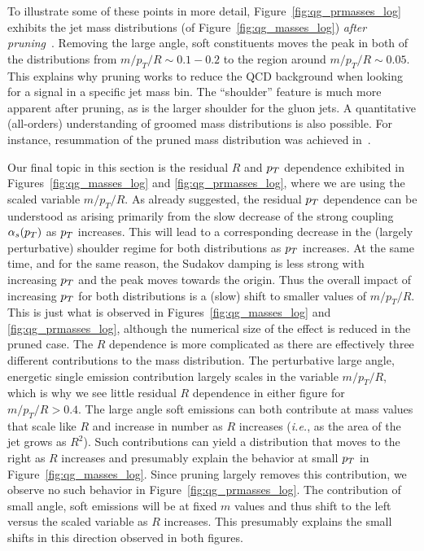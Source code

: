 To illustrate some of these points in more detail, Figure~\ref{fig:qg_prmasses_log} exhibits the jet mass distributions (of  Figure~\ref{fig:qg_masses_log}) 
\textit{after pruning}~\cite{Ellis:2009me,Ellis:2009su}.  Removing the large angle,  soft constituents
moves the peak in both of the distributions from  $m/p_T/R \sim 0.1 - 0.2$ to the region around $m/p_T/R \sim 0.05$.  This explains why pruning works to reduce the
QCD background when looking for a signal in a specific jet mass bin.  The ``shoulder'' feature is much more apparent after pruning, as is the larger shoulder for
the gluon jets.  A quantitative (all-orders) understanding of groomed mass distributions is also possible. For instance, resummation of the pruned mass distribution was achieved in~\cite{Dasgupta:2013ihk,Dasgupta:2013via}.

Our final topic in this section is the residual $R$ and $p_T$ dependence exhibited in Figures~\ref{fig:qg_masses_log} and \ref{fig:qg_prmasses_log}, where we are
using the scaled variable $m/p_T/R$.  As already suggested, the residual $p_T$ dependence can be understood as arising primarily from the slow decrease of the strong
coupling $\alpha_s(p_T)$ as $p_T$ increases.  This will lead to a corresponding decrease in the (largely perturbative) shoulder regime for both distributions
as $p_T$ increases.  At the same time, and for the same reason, the Sudakov damping is less strong with increasing $p_T$ and the peak moves towards the origin.
Thus the overall impact of increasing $p_T$ for both distributions is a (slow) shift to smaller values of $m/p_T/R$.  This is just what is observed in 
Figures~\ref{fig:qg_masses_log} and \ref{fig:qg_prmasses_log}, although the numerical size of the effect is reduced in the pruned case.
The $R$ dependence is more complicated as there are effectively three different contributions to the mass distribution.  
The perturbative large angle, energetic single emission contribution
largely scales in the variable $m/p_T/R$, which is why we see little residual $R$ dependence in either figure for $m/p_T/R > 0.4$.  
The large angle soft emissions can both contribute
at mass values that scale like $R$ and increase in number as $R$ increases (\textit{i.e.}, as the area of the jet grows as $R^2$).  Such contributions can yield
a distribution that moves to the right as $R$ increases and presumably explain the behavior at small $p_T$ in Figure~\ref{fig:qg_masses_log}.  Since pruning
largely removes this contribution, we observe no such behavior in Figure~\ref{fig:qg_prmasses_log}.  The contribution of small angle, soft emissions will be at
fixed $m$ values and thus shift to the left versus the scaled variable as $R$ increases.  
This presumably explains the small shifts in this direction observed in both figures.

